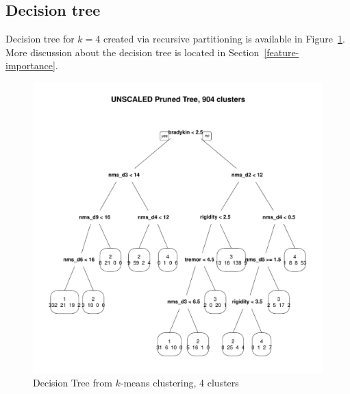 \documentclass[10pt]{article}
\begin{document}
\subsection{Decision tree}

Decision tree for $k = 4$ created via recursive partitioning is available in
Figure~\ref{fig:kmeans-dtree-4}. More discussion about the decision tree is
located in Section~\ref{feature-importance}.

\begin{figure}[h]
  \centering
  \includegraphics[width=\linewidth]{dtree-kmeans-pruned-unscaled-4.pdf}
  \caption{Decision Tree from $k$-means clustering, 4 clusters}
  \label{fig:kmeans-dtree-4}
\end{figure}
\end{document}

